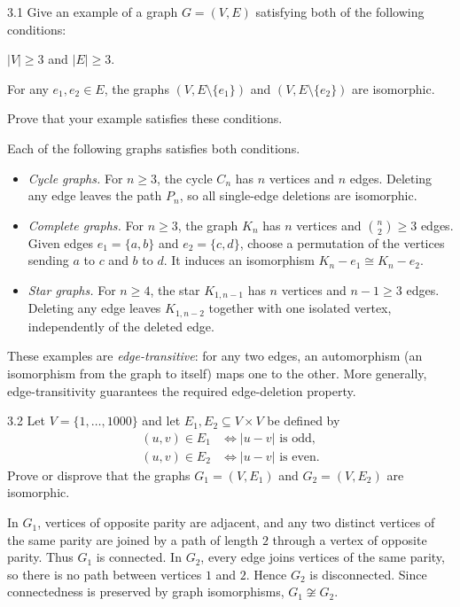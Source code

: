 \documentclass[11pt,oneside]{article}
\begin{document}
\begin{problem}{3.1}
Give an example of a graph $G=(V,E)$ satisfying both of the following conditions:
\begin{problemchoices}
\item $|V|\geq3$ and $|E|\geq3$.
\item For any $e_1,e_2\in E$, the graphs $(V,E\setminus\{e_1\})$ and $(V,E\setminus\{e_2\})$ are isomorphic.
\end{problemchoices}
Prove that your example satisfies these conditions.
\end{problem}

\begin{solution}
Each of the following graphs satisfies both conditions.
\begin{itemize}[leftmargin=2em,itemsep=0.35em,topsep=0.4em,parsep=0pt]
\item \emph{Cycle graphs.} For $n\geq3$, the cycle $C_n$ has $n$ vertices and $n$ edges. Deleting any edge leaves the path $P_n$, so all single-edge deletions are isomorphic.
\item \emph{Complete graphs.} For $n\geq3$, the graph $K_n$ has $n$ vertices and $\binom{n}{2}\geq3$ edges. Given edges $e_1=\{a,b\}$ and $e_2=\{c,d\}$, choose a permutation of the vertices sending $a$ to $c$ and $b$ to $d$. It induces an isomorphism $K_n-e_1\cong K_n-e_2$.
\item \emph{Star graphs.} For $n\geq4$, the star $K_{1,n-1}$ has $n$ vertices and $n-1\geq3$ edges. Deleting any edge leaves $K_{1,n-2}$ together with one isolated vertex, independently of the deleted edge.
\end{itemize}
These examples are \emph{edge-transitive}: for any two edges, an automorphism (an isomorphism from the graph to itself) maps one to the other. More generally, edge-transitivity guarantees the required edge-deletion property.
\end{solution}

\begin{problem}{3.2}
Let $V=\{1,\ldots,1000\}$ and let $E_1,E_2\subseteq V\times V$ be defined by
\[
\begin{aligned}
    (u,v)\in E_1 &\iff |u-v|\text{ is odd},\\
    (u,v)\in E_2 &\iff |u-v|\text{ is even}.
\end{aligned}
\]
Prove or disprove that the graphs $G_1=(V,E_1)$ and $G_2=(V,E_2)$ are isomorphic.
\end{problem}

\begin{solution}[1]
In $G_1$, vertices of opposite parity are adjacent, and any two distinct vertices of the same parity are joined by a path of length $2$ through a vertex of opposite parity. Thus $G_1$ is connected. In $G_2$, every edge joins vertices of the same parity, so there is no path between vertices $1$ and $2$. Hence $G_2$ is disconnected. Since connectedness is preserved by graph isomorphisms, $G_1\not\cong G_2$.
\end{solution}
\end{document}
